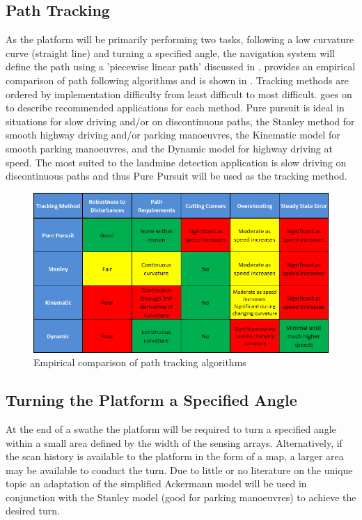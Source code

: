 \documentclass[main.tex]{subfiles}
\begin{document}
\subsection{Path Tracking}
As the platform will be primarily performing two tasks, following a low curvature curve (straight line) and turning a specified angle, the navigation system will define the path using a 'piecewise linear path' discussed in . \Textcite{snider2009} provides an empirical comparison of path following algorithms and is shown in . Tracking methods are ordered by implementation difficulty from least difficult to most difficult. \Textcite{snider2009} goes on to describe recommended applications for each method.  Pure pursuit is ideal in situations for slow driving and/or on discontinuous paths, the Stanley method for smooth highway driving and/or parking manoeuvres, the Kinematic model for smooth parking manoeuvres, and the Dynamic model for highway driving at speed. The most suited to the landmine detection application is slow driving on discontinuous paths and thus Pure Pursuit will be used as the tracking method.
\begin{figure}[ht]
\includegraphics[width = \textwidth]{4-ConceptDesign/pathTrackingSummary2.png}
\centering
\caption[Empirical comparison of path tracking algorithms]{Empirical comparison of path tracking algorithms \parencite{snider2009}} 
\end{figure}

\subsection{Turning the Platform a Specified Angle}
At the end of a swathe the platform will be required to turn a specified angle within a small area defined by the width of the sensing arrays. Alternatively, if the scan history is available to the platform in the form of a map, a larger area may be available to conduct the turn. Due to little or no literature on the unique topic an adaptation of the simplified Ackermann model will be used in conjunction with the Stanley model (good for parking manoeuvres) to achieve the desired turn.
\end{document}

